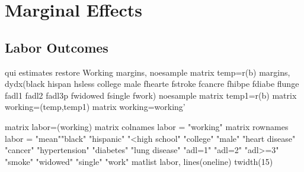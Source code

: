 \documentclass{article}
\begin{document}
\pagebreak
\section*{\centering Marginal Effects}
\subsection*{\centering Labor Outcomes}
\begin{Statacode}

qui estimates restore Working
margins, noesample
matrix temp=r(b)
margins, dydx(black hispan hsless college male fhearte fstroke fcancre fhibpe fdiabe flunge fadl1 fadl2 fadl3p fwidowed fsingle fwork) noesample
matrix temp1=r(b)
matrix working=(temp,temp1)
matrix working=working'

matrix labor=(working)
matrix colnames labor = "working"
matrix rownames labor = "mean""black" "hispanic" "<high school" "college" "male" "heart disease" "cancer" "hypertension" "diabetes" "lung disease" "adl=1" "adl=2" "adl>=3" "smoke" "widowed" "single" "work"
matlist labor, lines(oneline) twidth(15)  

\end{Statacode}
\end{document}
